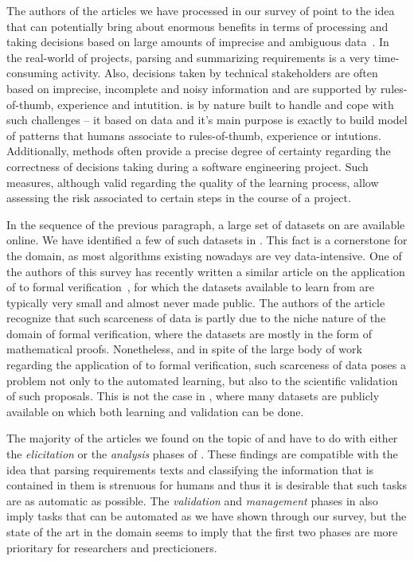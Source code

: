 The authors of the articles we have processed in our survey of point
to the idea that \ML can potentially bring about enormous benefits in terms of
processing and taking decisions based on  large amounts of imprecise and
ambiguous data~\cite{some citations here}. In the real-world of projects,
parsing and summarizing requirements is a very time-consuming activity. Also,
decisions taken by technical stakeholders are often based on imprecise,
incomplete and noisy information and are supported by rules-of-thumb, experience
and intutition. \ML is by nature built to handle and cope with such challenges
-- it based on data and it's main purpose is exactly to build model of patterns
that humans associate to rules-of-thumb, experience or intutions. Additionally,
\ML methods often provide a precise degree of certainty regarding the
correctness of decisions taking during a software engineering project. Such
measures, although valid regarding the quality of the learning process, allow
assessing the risk associated to certain steps in the course of a project.

In the sequence of the previous paragraph, a large set of datasets
on \RE are available online. We have identified a few of such datasets in
. This fact is a cornerstone for the domain, as most \ML
algorithms existing nowadays are vey data-intensive. One of the authors of this
survey has recently written a similar article on the application of \ML to
formal verification~\cite{AmLuBi:2018}, for which the datasets available
to learn from are typically very small and almost never made public. The authors
of the article recognize that such scarceness of data is partly due to the niche
nature of the domain of formal verification, where the datasets are mostly in
the form of mathematical proofs. Nonetheless, and in spite of the large body of
work regarding the application of \ML to formal verification, such scarceness of
data poses a problem not only to the automated learning, but also to the
scientific validation of such proposals. This is not the case in \RE, where many
datasets are publicly available on which both learning and validation can be
done.

The majority of the articles we found on the topic of \ML and \RE have to do
with either the \emph{elicitation} or the \emph{analysis} phases of \RE{}. These findings are compatible with the idea that parsing
requirements texts and classifying the information that is contained in them is
strenuous for humans and thus it is desirable that such tasks are as automatic
as possible. The \emph{validation} and \emph{management} phases in \RE also
imply tasks that can be automated as we have shown through our survey, but
the state of the art in the domain seems to imply that the first two phases are
more prioritary for researchers and precticioners.

